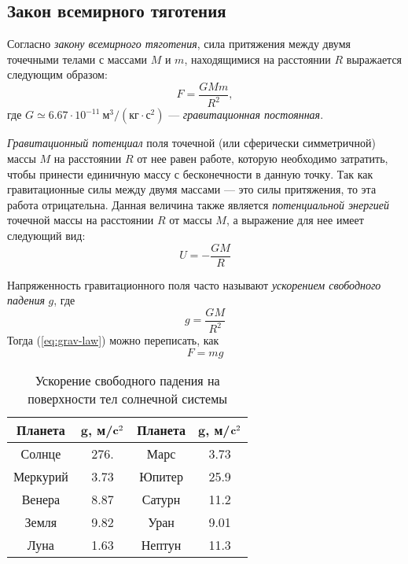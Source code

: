 \subsection{Закон всемирного тяготения}
Согласно {\itshape закону всемирного тяготения}, сила притяжения 
между двумя точечными телами с массами $M$ и $m$,
находящимися на расстоянии $R$ выражается следующим
образом:\begin{equation}
	F=\frac{GMm}{R^2}, \label{eq:grav-law}
\end{equation}
где $G\simeq 6.67\cdot 10^{-11}~\text{м}^3 / 
\left( \text{кг} \cdot \text{с}^2 \right)$ --- 
{\itshape гравитационная постоянная}.

{\itshape Гравитационный потенциал} поля точечной (или сферически 
симметричной) массы $M$ на расстоянии $R$ от нее равен
работе, которую необходимо затратить, чтобы принести
единичную массу с бесконечности в данную точку. Так как
гравитационные силы между двумя массами --- это силы 
притяжения, то эта работа отрицательна. Данная
величина также является {\itshape потенциальной энергией} точечной
массы на расстоянии $R$ от массы $M$, а выражение для нее имеет 
следующий вид:\begin{equation}
U=-\frac{GM}{R}
\end{equation}

Напряженность гравитационного поля часто называют 
{\itshape ускорением свободного падения} $g$, где\begin{equation}
	g = \frac{GM}{R^2}
\end{equation}
Тогда (\ref{eq:grav-law}) можно переписать, как \begin{equation}
	F = mg
\end{equation}
\begin{table}[h!]
\centering
\begin{tabular}{|c|c|c|c|}
\hline 
{\bfseries Планета} & $\mathbf{g}$, 
{\bfseries м/$\text{\bfseries c}^2$} 
& {\bfseries Планета} & $\mathbf{g}$, 
{\bfseries м/$\text{\bfseries c}^2$}\\
\hline
Солнце & 276. & Марс & 3.73\\
\hline
Меркурий & 3.73 & Юпитер & 25.9\\
\hline
Венера & 8.87 & Сатурн & 11.2\\
\hline
Земля & 9.82 & Уран & 9.01\\
\hline
Луна & 1.63 & Нептун & 11.3\\
\hline
\end{tabular}
\caption{Ускорение свободного падения на поверхности тел 
солнечной системы}
\end{table}
